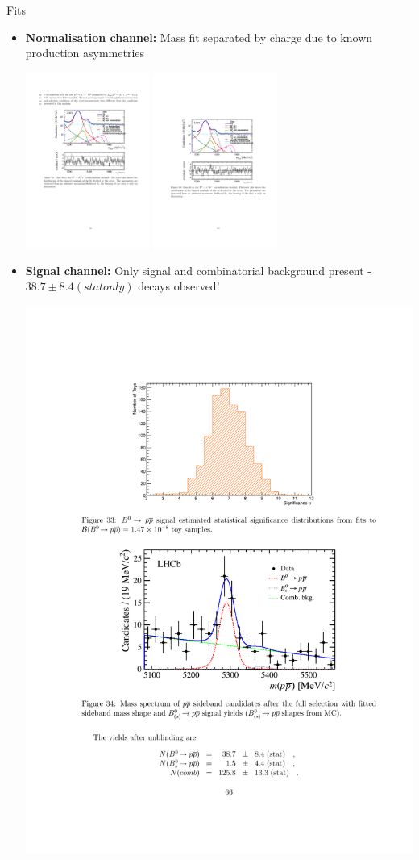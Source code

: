 \documentclass{beamer}
\begin{document}
\begin{frame}{Fits}
  \small
  \begin{itemize}
  \item \textbf{Normalisation channel:} Mass fit separated by charge due to known production asymmetries
  \begin{center}
    \includegraphics[width=0.32\textwidth]{PPNormMassFit.pdf}
    \includegraphics[width=0.32\textwidth]{PPNormMassFitBar.pdf}
  \end{center}
  \item \textbf{Signal channel:} Only signal and combinatorial background present - $38.7\pm8.4(stat only)$ \decay{\Bd}{\proton\antiproton} decays observed!
    \begin{center}
      \includegraphics[width=.4\textwidth]{PPSignalMassFit.pdf}
    \end{center}
  \end{itemize}
\end{frame}
\end{document}
